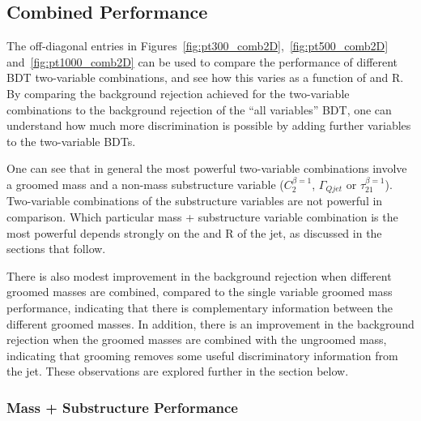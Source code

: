 \subsection{Combined Performance}

The off-diagonal entries in Figures~\ref{fig:pt300_comb2D},~\ref{fig:pt500_comb2D}
and~\ref{fig:pt1000_comb2D} can be used to compare the performance
of different BDT two-variable combinations, and see how this varies as
a function of \pt and R. By comparing the background rejection
achieved for the two-variable combinations to the background rejection
of the ``all variables'' BDT, one can understand how much more
discrimination is possible by adding further variables to the
two-variable BDTs.

One can see that in general the most powerful two-variable
combinations involve a groomed mass and a non-mass substructure
variable ($C_2^{\beta=1}$, $\Gamma_{Qjet}$ or
$\tau_{21}^{\beta=1}$). Two-variable combinations of the substructure
variables are not powerful in comparison.  Which particular mass +
substructure variable combination is the most
powerful depends strongly on the \pt and R of the jet, as discussed
in the sections that follow. 


There is also modest improvement in
the background rejection when different groomed masses are combined,
compared to the single variable groomed mass performance, indicating that there is complementary information between the
different groomed masses. In addition, there is an improvement in the
background rejection when the groomed masses are combined with the
ungroomed mass, indicating that grooming removes some useful
discriminatory information from the jet. These observations are
explored further in the section below.

\subsubsection{Mass + Substructure Performance}

